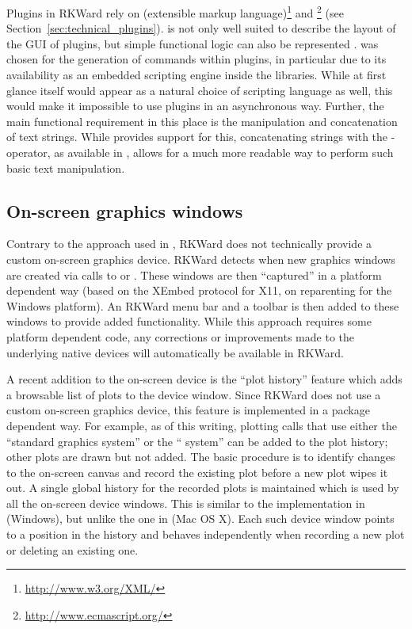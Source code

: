 Plugins in RKWard rely on  (extensible markup language)\footnote{\url{http://www.w3.org/XML/}}
and \footnote{\url{http://www.ecmascript.org/}} (see Section~\ref{sec:technical_plugins}).  is not
only well suited to describe the layout of the GUI of plugins, but simple
functional logic can also be represented \citep[see also][]{Visne2009}.  was
chosen for the generation of  commands within plugins, in particular due to its
availability as an embedded scripting engine inside the  libraries. While at
first glance  itself would appear as a natural choice of scripting language as
well, this would make it impossible to use plugins in an asynchronous way.
Further, the main functional requirement in this place is the manipulation and
concatenation of text strings. While  provides support for this, concatenating
strings with the \code{+}-operator, as available in , allows for a much
more readable way to perform such basic text manipulation.

\subsection{On-screen graphics windows}
\label{sec:technical_graphics}
Contrary to the approach used in  \citep{HelbigTheus2005}, RKWard does
not technically provide a custom on-screen graphics device. RKWard detects when
new graphics windows are created via calls to  or . These windows
are then ``captured'' in a platform dependent way (based on the XEmbed \citep{Ettrich2002} protocol
for X11, on reparenting for the Windows platform). An RKWard menu bar and a
toolbar is then added to these windows to provide added functionality. While
this approach requires some platform dependent code, any corrections or
improvements made to the underlying  native devices will automatically be
available in RKWard.

A recent addition to the on-screen device is the ``plot history'' feature which
adds a browsable list of plots to the device window. Since RKWard does not use a
custom on-screen graphics device, this feature is implemented in a package
dependent way. For example, as of this writing, plotting calls that use either
the ``standard graphics system'' or the `` system'' can be added to the plot
history; other plots are drawn but not added. The basic procedure is to identify
changes to the on-screen canvas and record the existing plot before a new plot
wipes it out. A single global history for the recorded plots is maintained
which is used by all the on-screen device windows. This is similar to the
implementation in  (Windows), but unlike the one in  
(Mac OS X). Each such device window points to a position in the history
and behaves independently when recording a new plot or deleting an existing
one.


